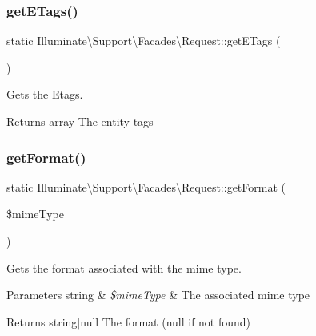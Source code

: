 \subsubsection{\texorpdfstring{get\+E\+Tags()}{getETags()}}
{\footnotesize\ttfamily static Illuminate\textbackslash{}\+Support\textbackslash{}\+Facades\textbackslash{}\+Request\+::get\+E\+Tags (\begin{DoxyParamCaption}{ }\end{DoxyParamCaption})\hspace{0.3cm}{\ttfamily [static]}}

Gets the Etags.

\begin{DoxyReturn}{Returns}
array The entity tags 
\end{DoxyReturn}
\mbox{\label{class_illuminate_1_1_support_1_1_facades_1_1_request_a9c6751c567d605886a8a95ef3f181af0}} 
\subsubsection{\texorpdfstring{get\+Format()}{getFormat()}}
{\footnotesize\ttfamily static Illuminate\textbackslash{}\+Support\textbackslash{}\+Facades\textbackslash{}\+Request\+::get\+Format (\begin{DoxyParamCaption}\item[{}]{\$mime\+Type }\end{DoxyParamCaption})\hspace{0.3cm}{\ttfamily [static]}}

Gets the format associated with the mime type.


\begin{DoxyParams}[1]{Parameters}
string & {\em \$mime\+Type} & The associated mime type \\
\hline
\end{DoxyParams}
\begin{DoxyReturn}{Returns}
string$\vert$null The format (null if not found) 
\end{DoxyReturn}
\mbox{\label{class_illuminate_1_1_support_1_1_facades_1_1_request_a4a7a300d1d1c514c99bb8ac080cfd872}} 
